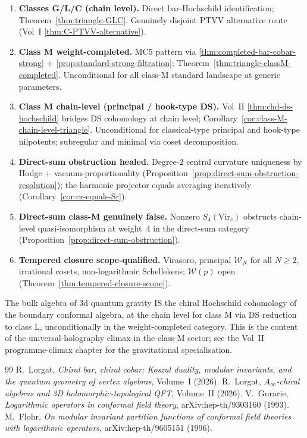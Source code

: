 \documentclass[11pt]{amsart}
\theoremstyle{definition}
\theoremstyle{remark}
\providecommand{\cW}{\mathcal{W}}
\begin{document}
\begin{enumerate}[label=\textup{(\arabic*)}]
\item \textbf{Classes G/L/C (chain level).} Direct bar-Hochschild
  identification; Theorem~\ref{thm:triangle-GLC}. Genuinely disjoint
  PTVV alternative route (Vol~I \ref*{thm:C-PTVV-alternative}).
\item \textbf{Class M weight-completed.} MC5 pattern via
  \ref*{thm:completed-bar-cobar-strong} +
  \ref*{prop:standard-strong-filtration};
  Theorem~\ref{thm:triangle-classM-completed}. Unconditional for all
  class-M standard landscape at generic parameters.
\item \textbf{Class M chain-level (principal / hook-type DS).} Vol~II
  \ref*{thm:chd-ds-hochschild} bridges DS cohomology at chain
  level; Corollary~\ref{cor:class-M-chain-level-triangle}. Unconditional
  for classical-type principal and hook-type nilpotents; subregular and
  minimal via coset decomposition.
\item \textbf{Direct-sum obstruction healed.} Degree-$2$ central curvature uniqueness
  by Hodge + vacuum-proportionality
  (Proposition~\ref{prop:direct-sum-obstruction-resolution}); the harmonic
  projector equals averaging iteratively
  (Corollary~\ref{cor:cr-equals-Sr}).
\item \textbf{Direct-sum class-M genuinely false.} Nonzero
  $S_4(\mathrm{Vir}_c)$ obstructs chain-level quasi-isomorphism
  at weight~$4$ in the direct-sum category
  (Proposition~\ref{prop:direct-sum-obstruction}).
\item \textbf{Tempered closure scope-qualified.} Virasoro,
  principal $\cW_N$ for all $N \ge 2$, irrational cosets,
  non-logarithmic Schellekens; $\cW(p)$ open
  (Theorem~\ref{thm:tempered-closure-scope}).
\end{enumerate}

The bulk algebra of 3d quantum gravity IS the chiral Hochschild
cohomology of the boundary conformal algebra, at the chain level
for class M via DS reduction to class L, unconditionally in the
weight-completed category. This is the content of the
universal-holography climax in the class-M sector; see the Vol~II
programme-climax chapter for the gravitational specialisation.

\begin{thebibliography}{99}
 R.~Lorgat,
\emph{Chiral bar, chiral cobar: Koszul duality, modular invariants,
and the quantum geometry of vertex algebras}, Volume~I (2026).
 R.~Lorgat,
\emph{$A_\infty$-chiral algebras and 3D holomorphic-topological QFT},
Volume~II (2026).
 V.~Gurarie,
\emph{Logarithmic operators in conformal field theory},
arXiv:hep-th/9303160 (1993).
 M.~Flohr,
\emph{On modular invariant partition functions of conformal field
theories with logarithmic operators},
arXiv:hep-th/9605151 (1996).
\end{thebibliography}
\end{document}
